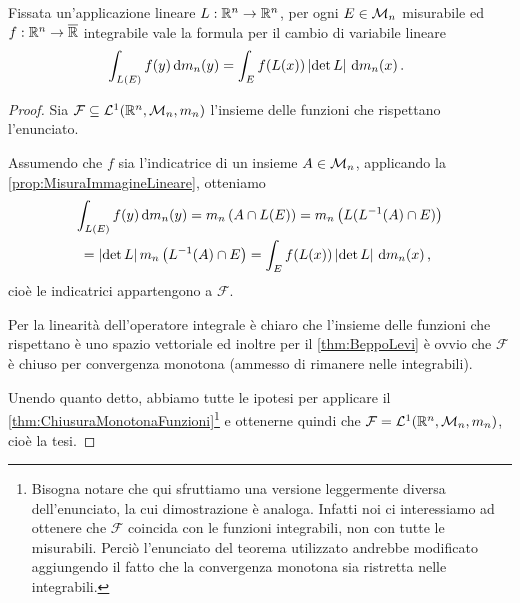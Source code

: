 \begin{corollary}\label{cor:CambioVariabileLineare}
	Fissata un'applicazione lineare $L:\mathbb R^n\to\mathbb R^n$, per ogni $E\in\mathcal M_n$ misurabile ed $f:\mathbb R^n\to\overline{\mathbb R}$ integrabile vale la formula per il cambio di variabile lineare
	\begin{equation*}
		\int_{L(E)}f(y)\,\mathrm d m_n(y) = \int_E f(L(x))\left\lvert\det L\right\rvert \,\mathrm d m_n(x) \, \text{. }
	\end{equation*}
\end{corollary}
\begin{proof}
	Sia $\mathcal F\subseteq \mathcal L^1(\mathbb R^n,\mathcal M_n,m_n)$ l'insieme delle funzioni che rispettano l'enunciato.
	
	Assumendo che $f$ sia l'indicatrice di un insieme $A\in\mathcal M_n$, applicando la \cref{prop:MisuraImmagineLineare}, otteniamo
	\begin{multline*}
		\int_{L(E)}f(y)\,\mathrm d m_n(y)=m_n\left( A\cap L(E) \right)=m_n\left(L(L^{-1}(A)\cap E)\right)\\
		=\left\lvert\det L\right\rvert m_n\left(L^{-1}(A)\cap E\right)=\int_E f(L(x))\left\lvert\det L\right\rvert \,\mathrm d m_n(x) \, \text{, }
	\end{multline*}
	cioè le indicatrici appartengono a $\mathcal F$.
	
	Per la linearità dell'operatore integrale è chiaro che l'insieme delle funzioni che rispettano è uno spazio vettoriale ed inoltre per il \cref{thm:BeppoLevi} è ovvio che $\mathcal F$ è chiuso per convergenza monotona (ammesso di rimanere nelle integrabili).
	
	Unendo quanto detto, abbiamo tutte le ipotesi per applicare il \cref{thm:ChiusuraMonotonaFunzioni}\footnote{Bisogna notare che qui sfruttiamo una versione leggermente diversa dell'enunciato, la cui dimostrazione è analoga. Infatti noi ci interessiamo ad ottenere che $\mathcal F$ coincida con le funzioni integrabili, non con tutte le misurabili. 
	Perciò l'enunciato del teorema utilizzato andrebbe modificato aggiungendo il fatto che la convergenza monotona sia ristretta nelle integrabili.} e ottenerne quindi che $\mathcal F=\mathcal L^1(\mathbb R^n,\mathcal M_n,m_n)$, cioè la tesi.
\end{proof}

